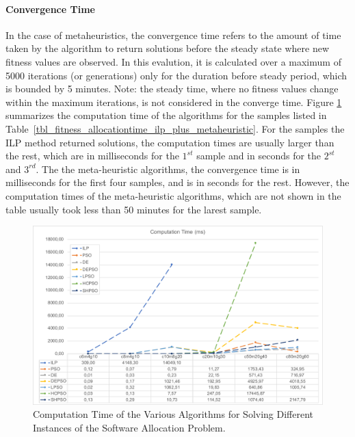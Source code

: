 \paragraph{Convergence Time} In the case of metaheuristics, the convergence time refers to the amount of time taken by the algorithm to return solutions before the steady state where new fitness values are observed. In this evalution, it is calculated over a maximum of 5000 iterations (or generations) only for the duration before steady period, which is bounded by 5 minutes. Note: the steady time, where no fitness values change within the maximum iterations, is not considered in the converge time.  Figure \ref{fig_allocationtime_ilp_metaheuristic} summarizes the computation time of the algorithms for the samples listed in Table~\ref{tbl_fitness_allocationtime_ilp_plus_metaheuristic}. For the samples the ILP method returned solutions, the computation times are usually larger than the rest, which are in milliseconds for the $1^{st}$ sample and in seconds for the $2^{st}$  and $3^{rd}$.  The the meta-heuristic algorithms, the convergence time is in milliseconds for the first four samples, and is in seconds for the rest. However, the computation times of the meta-heuristic algorithms, which are not shown in the table usually took less than 50 minutes for the larest sample.
\begin{figure}
\centering
\includegraphics[width=1\linewidth]{img/time_summary.pdf}
\caption{Computation Time of the Various Algorithms for Solving Different Instances of the Software Allocation Problem.}
\label{fig_allocationtime_ilp_metaheuristic}\vspace{-0.4cm}
\end{figure}
%

